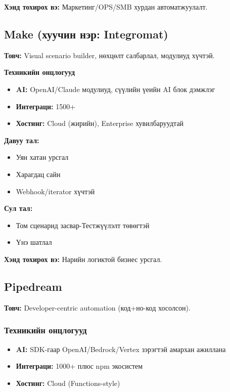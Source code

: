 \textbf{Хэнд тохирох вэ:} Маркетинг/OPS/SMB хурдан автоматжуулалт.

\subsection{Make (хуучин нэр: Integromat)}

\textbf{Товч:} Visual scenario builder, нөхцөлт салбарлал, модулиуд хүчтэй.

\textbf{Техникийн онцлогууд}
\begin{itemize}
    \item \textbf{AI:} OpenAI/Claude модулиуд, сүүлийн үеийн AI блок дэмжлэг
    \item \textbf{Интеграци:} 1500+
    \item \textbf{Хостинг:} Cloud (жирийн), Enterprise хувилбаруудтай
\end{itemize}

{\textbf{Давуу тал:}}
\begin{itemize}
    \item Уян хатан урсгал
    \item Харагдац сайн
    \item Webhook/iterator хүчтэй
\end{itemize}

{\textbf{Сул тал:}}
\begin{itemize}
    \item Том сценарид засвар-Тестжүүлэлт төвөгтэй
    \item Үнэ шатлал
\end{itemize}

\textbf{Хэнд тохирох вэ:} Нарийн логиктой бизнес урсгал.

\subsection{Pipedream}

\textbf{Товч:} Developer-centric automation (код+но-код хосолсон).

\subsubsection{Техникийн онцлогууд}
\begin{itemize}
    \item \textbf{AI:} SDK-гаар OpenAI/Bedrock/Vertex зэрэгтэй амархан ажиллана
    \item \textbf{Интеграци:} 1000+ плюс npm экосистем
    \item \textbf{Хостинг:} Cloud (Functions-style)
\end{itemize}


